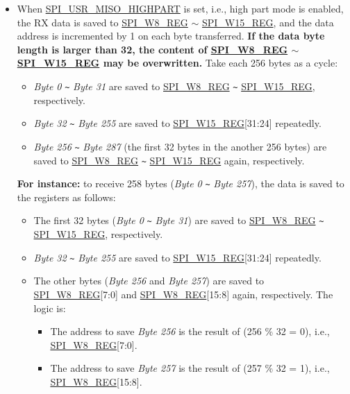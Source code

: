\documentclass[main\_\_EN.tex]{subfiles}
\begin{document}
\begin{itemize}
\begin{itemize}
        \item When \hyperref[fielddesc:SPIUSRMISOHIGHPART]{SPI\_USR\_MISO\_HIGHPART} is set, i.e., high part mode is enabled, the RX data is saved to \hyperref[regdesc:SPIW0REG]{SPI\_W8\_REG} $\sim$ \hyperref[regdesc:SPIW0REG]{SPI\_W15\_REG}, and the data address is incremented by 1 on each byte transferred. \textbf{If the data byte length is larger than 32, the content of \hyperref[regdesc:SPIW0REG]{SPI\_W8\_REG} $\sim$ \hyperref[regdesc:SPIW0REG]{SPI\_W15\_REG} may be overwritten.} Take each 256 bytes as a cycle:
        \begin{itemize}
            \item \emph{Byte 0} \verb+~+ \emph{Byte 31} are saved to \hyperref[regdesc:SPIW0REG]{SPI\_W8\_REG} \verb+~+ \hyperref[regdesc:SPIW0REG]{SPI\_W15\_REG}, respectively.
            \item \emph{Byte 32} \verb+~+ \emph{Byte 255} are saved to \hyperref[regdesc:SPIW0REG]{SPI\_W15\_REG}[31:24] repeatedly.
            \item \emph{Byte 256} \verb+~+ \emph{Byte 287} (the first 32 bytes in the another 256 bytes) are saved to \hyperref[regdesc:SPIW0REG]{SPI\_W8\_REG} \verb+~+ \hyperref[regdesc:SPIW0REG]{SPI\_W15\_REG} again, respectively.
        \end{itemize}

        \textbf{For instance:} to receive 258 bytes (\emph{Byte 0} \verb+~+ \emph{Byte 257}), the data is saved to the registers as follows:
        \begin{itemize}
            \item The first 32 bytes (\emph{Byte 0} \verb+~+ \emph{Byte 31}) are saved to \hyperref[regdesc:SPIW0REG]{SPI\_W8\_REG} \verb+~+ \hyperref[regdesc:SPIW0REG]{SPI\_W15\_REG}, respectively.
            \item \emph{Byte 32} \verb+~+ \emph{Byte 255} are saved to \hyperref[regdesc:SPIW0REG]{SPI\_W15\_REG}[31:24] repeatedly.
            \item The other bytes (\emph{Byte 256} and \emph{Byte 257}) are saved to \hyperref[regdesc:SPIW0REG]{SPI\_W8\_REG}[7:0] and \hyperref[regdesc:SPIW0REG]{SPI\_W8\_REG}[15:8] again, respectively. The logic is:
            \begin{itemize}
                \item The address to save \emph{Byte 256} is the result of (256 \% 32 = 0), i.e., \hyperref[regdesc:SPIW0REG]{SPI\_W8\_REG}[7:0].
                \item The address to save \emph{Byte 257} is the result of (257 \% 32 = 1), i.e., \hyperref[regdesc:SPIW0REG]{SPI\_W8\_REG}[15:8].
            \end{itemize}
        \end{itemize}
    \end{itemize}
\end{itemize}
\end{document}
